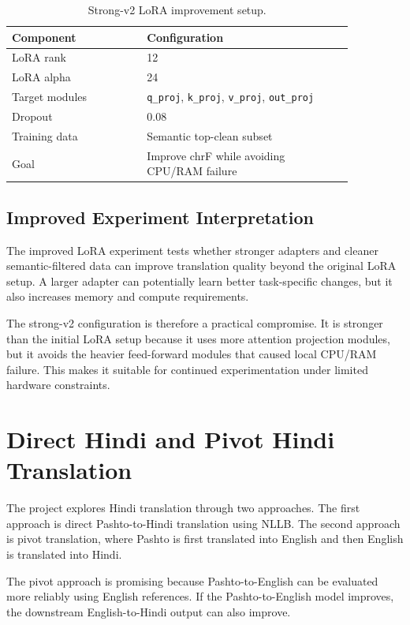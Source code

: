 \documentclass[conference]{IEEEtran}
\begin{document}
\begin{table}[H]
\centering
\caption{Strong-v2 LoRA improvement setup.}
\footnotesize
\begin{tabular}{p{0.34\linewidth}p{0.52\linewidth}}
\toprule
\textbf{Component} & \textbf{Configuration} \\
\midrule
LoRA rank & 12 \\
LoRA alpha & 24 \\
Target modules & \texttt{q\_proj}, \texttt{k\_proj}, \texttt{v\_proj}, \texttt{out\_proj} \\
Dropout & 0.08 \\
Training data & Semantic top-clean subset \\
Goal & Improve chrF while avoiding CPU/RAM failure \\
\bottomrule
\end{tabular}
\end{table}

\subsection{Improved Experiment Interpretation}

The improved LoRA experiment tests whether stronger adapters and cleaner semantic-filtered data can improve translation quality beyond the original LoRA setup. A larger adapter can potentially learn better task-specific changes, but it also increases memory and compute requirements.

The strong-v2 configuration is therefore a practical compromise. It is stronger than the initial LoRA setup because it uses more attention projection modules, but it avoids the heavier feed-forward modules that caused local CPU/RAM failure. This makes it suitable for continued experimentation under limited hardware constraints.

\section{Direct Hindi and Pivot Hindi Translation}

The project explores Hindi translation through two approaches. The first approach is direct Pashto-to-Hindi translation using NLLB. The second approach is pivot translation, where Pashto is first translated into English and then English is translated into Hindi.

The pivot approach is promising because Pashto-to-English can be evaluated more reliably using English references. If the Pashto-to-English model improves, the downstream English-to-Hindi output can also improve.
\end{document}
